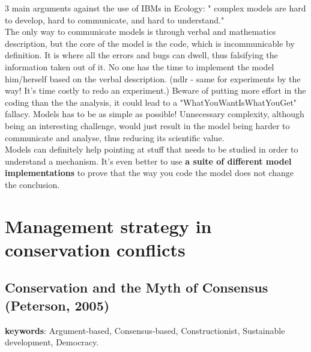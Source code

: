 \documentclass[12pt]{article}
\begin{document}
3 main arguments against the use of IBMs in Ecology: " complex  models  are  hard  to develop,   hard to   communicate,   and   hard   to understand."\\
The only way to communicate models is through verbal and mathematics description, but the core of the model is the code, which is incommunicable by definition. It is where all the errors and bugs can dwell, thus falsifying the information taken out of it. No one has the time to implement the model him/herself based on the verbal description. (ndlr - same for experiments by the way! It's time costly to redo an experiment.) Beware of putting more effort in the coding than the the analysis, it could lead to a "WhatYouWantIsWhatYouGet" fallacy. Models has to be as simple as possible! Unnecessary complexity, although being an interesting challenge, would just result in the model being harder to communicate and analyse, thus reducing its scientific value.\\
Models can definitely help pointing at stuff that needs to be studied in order to understand a mechanism. It's even better to use \textbf{a suite of different model implementations} to prove that the way you code the model does not change the conclusion.

\section{Management strategy in conservation conflicts}

\subsection{Conservation and the Myth of Consensus (Peterson, 2005)}
\textbf{keywords}: Argument-based, Consensus-based, Constructionist, Sustainable development, Democracy.\\
\end{document}
